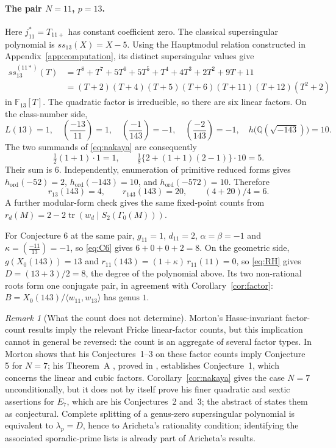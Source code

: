 \documentclass[11pt,a4paper]{article}
\theoremstyle{remark}\newtheorem{remark}[theorem]{Remark}
\numberwithin{equation}{section}
\newcommand{\Q}{\mathbb Q}\newcommand{\Z}{\mathbb Z}
\newcommand{\leg}[2]{\left(\frac{#1}{#2}\right)}
\newcommand{\ho}{h_{\mathrm{ord}}}
\newcommand{\hK}[1]{h\bigl(\Q(\sqrt{-#1})\bigr)}
\begin{document}
	\paragraph{The pair $N=11$, $p=13$.}
	Here $j_{11}^*=T_{11+}$ has constant coefficient zero. The classical supersingular polynomial is $ss_{13}(X)=X-5$. Using the Hauptmodul relation constructed in Appendix~\ref{app:computation}, its distinct supersingular values give
	\begin{align*}
		ss_{13}^{(11*)}(T)
		&=T^8+T^7+5T^6+5T^5+T^4+4T^3+2T^2+9T+11\\
		&=(T+2)(T+4)(T+5)(T+6)(T+11)(T+12)(T^2+2)
	\end{align*}
	in $\mathbb F_{13}[T]$. The quadratic factor is irreducible, so there are six linear factors. On the class-number side,
	\[
	L(13)=1,\quad \leg{-13}{11}=1,\quad
	\leg{-1}{143}=-1,\quad \leg{-2}{143}=-1,\quad \hK{143}=10.
	\]
	The two summands of \eqref{eq:nakaya} are consequently
	\[
	\tfrac12(1+1)\cdot1=1,\qquad
	\tfrac18\{2+(1+1)(2-1)\}\cdot10=5.
	\]
	Their sum is $6$. Independently, enumeration of primitive reduced forms gives $\ho(-52)=2$, $\ho(-143)=10$, and $\ho(-572)=10$. Therefore
	\[
	r_{13}(143)=4,\qquad r_{143}(143)=20,\qquad (4+20)/4=6.
	\]
	A further modular-form check gives the same fixed-point counts from $r_d(M)=2-2\operatorname{tr}(w_d\mid S_2(\Gamma_0(M)))$.
	
	For Conjecture 6 at the same pair, $g_{11}=1$, $d_{11}=2$, $\alpha=\beta=-1$ and $\kappa=\leg{-11}{13}=-1$, so \eqref{eq:C6} gives $6+0+0+2=8$. On the geometric side, $g(X_0(143))=13$ and $r_{11}(143)=(1+\kappa)\,r_{11}(11)=0$, so \eqref{eq:RH} gives $D=(13+3)/2=8$, the degree of the polynomial above. Its two non-rational roots form one conjugate pair, in agreement with Corollary~\ref{cor:factor}: $B=X_0(143)/\langle w_{11},w_{13}\rangle$ has genus $1$.
	
	\begin{remark}[What the count does not determine]\label{rem:morton}
		Morton's Hasse-invariant factor-count results imply the relevant Fricke linear-factor counts, but this implication cannot in general be reversed: the count is an aggregate of several factor types. In \cite[Section 3, pp.~347--353]{Morton7} Morton shows that his Conjectures~1--3 on these factor counts \cite[Section 2, pp.~345--346]{Morton7} imply Conjecture 5 for $N=7$; his Theorem~A \cite[p.~342]{Morton7}, proved in \cite[Section 6]{Morton7}, establishes Conjecture~1, which concerns the linear and cubic factors. Corollary~\ref{cor:nakaya} gives the case $N=7$ unconditionally, but it does not by itself prove his finer quadratic and sextic assertions for $E_7$, which are his Conjectures~2 and~3; the abstract of \cite{Morton7} states them as conjectural. Complete splitting of a genus-zero supersingular polynomial is equivalent to $\lambda_p=D$, hence to Aricheta's rationality condition; identifying the associated sporadic-prime lists is already part of Aricheta's results.
	\end{remark}
	
\end{document}
